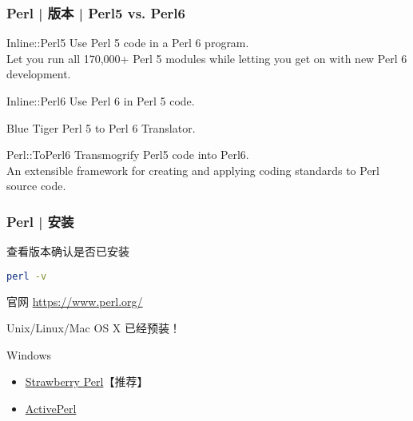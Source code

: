 \begin{frame}[fragile]
  \frametitle{Perl | 版本 | Perl5 vs. Perl6}
  \begin{block}{Inline::Perl5}
    Use Perl 5 code in a Perl 6 program.\\
    Let you run all 170,000+ Perl 5 modules while letting you get on with new Perl 6 development.
  \end{block}
  \pause
  \begin{block}{Inline::Perl6}
    Use Perl 6 in Perl 5 code.
  \end{block}
  \pause
  \begin{block}{Blue Tiger}
    Perl 5 to Perl 6 Translator.
  \end{block}
  \pause
  \begin{block}{Perl::ToPerl6}
    Transmogrify Perl5 code into Perl6.\\
    An extensible framework for creating and applying coding standards to Perl source code.
  \end{block}
\end{frame}

\begin{frame}[fragile]
  \frametitle{Perl | 安装}
  \begin{block}{\alert{查看版本}确认是否已安装}
\begin{lstlisting}[language=bash]
perl -v
\end{lstlisting}
  \end{block}
  \pause
  \begin{block}{官网}
    \href{https://www.perl.org/}{https://www.perl.org/}
  \end{block}
  \pause
  \begin{block}{Unix/Linux/Mac OS X}
    已经预装！
  \end{block}
  \pause
  \begin{block}{Windows}
    \begin{itemize}
      \item \href{http://strawberryperl.com/}{Strawberry Perl}【推荐】
      \item \href{http://www.activestate.com/activeperl/downloads}{ActivePerl}
    \end{itemize}
  \end{block}
\end{frame}

